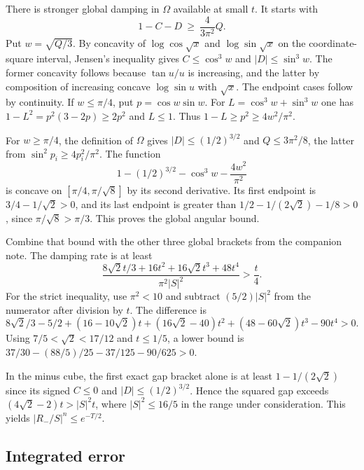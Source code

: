\documentclass[11pt]{article}
\begin{document}
There is stronger global damping in $\Omega$ available at small $t$. It starts with
\[
1-C-D\ \ge\ \frac{4}{3\pi^2}Q .
\]
Put $w=\sqrt{Q/3}$. By concavity of $\log\cos\sqrt x$ and $\log\sin\sqrt x$ on the coordinate-square interval, Jensen's inequality gives $C\le\cos^3w$ and $|D|\le\sin^3w$. The former concavity follows because $\tan u/u$ is increasing, and the latter by composition of increasing concave $\log\sin u$ with $\sqrt x$. The endpoint cases follow by continuity. If $w\le\pi/4$, put $p=\cos w\sin w$. For $L=\cos^3w+\sin^3w$ one has $1-L^2=p^2(3-2p)\ge2p^2$ and $L\le1$. Thus $1-L\ge p^2\ge4w^2/\pi^2$.

For $w\ge\pi/4$, the definition of $\Omega$ gives $|D|\le(1/2)^{3/2}$ and $Q\le3\pi^2/8$, the latter from $\sin^2 p_i\ge4p_i^2/\pi^2$. The function
\[
1-(1/2)^{3/2}-\cos^3 w-\frac{4w^2}{\pi^2}
\]
is concave on $[\pi/4,\pi/\sqrt8]$ by its second derivative. Its first endpoint is $3/4-1/\sqrt2>0$, and its last endpoint is greater than $1/2-1/(2\sqrt2)-1/8>0$, since $\pi/\sqrt8>\pi/3$. This proves the global angular bound.

Combine that bound with the other three global brackets from the companion note. The damping rate is at least
\[
\frac{8\sqrt2t/3+16t^2+16\sqrt2t^3+48t^4}{\pi^2|S|^2}>\frac{t}{4}.
\]
For the strict inequality, use $\pi^2<10$ and subtract $(5/2)|S|^2$ from the numerator after division by $t$. The difference is
\[
8\sqrt2/3-5/2+(16-10\sqrt2)t+
(16\sqrt2-40)t^2+(48-60\sqrt2)t^3-90t^4>0.
\]
Using $7/5<\sqrt2<17/12$ and $t\le1/5$, a lower bound is $37/30-(88/5)/25-37/125-90/625>0$.

In the minus cube, the first exact gap bracket alone is at least $1-1/(2\sqrt2)$ since its signed $C\le0$ and $|D|\le(1/2)^{3/2}$. Hence the squared gap exceeds $(4\sqrt2-2)t>|S|^2t$, where $|S|^2\le16/5$ in the range under consideration. This yields $|R_-/S|^n\le e^{-T/2}$.

\subsection{Integrated error}
\label{sec:integrated-error}
\end{document}
